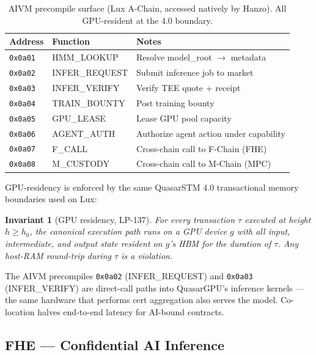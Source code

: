 \documentclass[11pt,letterpaper]{article}
\newtheorem{invariant}{Invariant}[section]
\begin{document}
\begin{table}[H]
\centering
\small
\begin{tabular}{lll}
\toprule
\textbf{Address} & \textbf{Function} & \textbf{Notes} \\
\midrule
\texttt{0x0a01} & \textsc{HMM\_LOOKUP} & Resolve model\_root $\to$ metadata \\
\texttt{0x0a02} & \textsc{INFER\_REQUEST} & Submit inference job to market \\
\texttt{0x0a03} & \textsc{INFER\_VERIFY} & Verify TEE quote + receipt \\
\texttt{0x0a04} & \textsc{TRAIN\_BOUNTY} & Post training bounty \\
\texttt{0x0a05} & \textsc{GPU\_LEASE} & Lease GPU pool capacity \\
\texttt{0x0a06} & \textsc{AGENT\_AUTH} & Authorize agent action under capability \\
\texttt{0x0a07} & \textsc{F\_CALL} & Cross-chain call to F-Chain (FHE) \\
\texttt{0x0a08} & \textsc{M\_CUSTODY} & Cross-chain call to M-Chain (MPC) \\
\bottomrule
\end{tabular}
\caption{AIVM precompile surface (Lux A-Chain, accessed natively by Hanzo). All GPU-resident at the 4.0 boundary.}
\end{table}

GPU-residency is enforced by the same QuasarSTM 4.0 transactional
memory boundaries used on Lux:

\begin{invariant}[GPU residency, LP-137]
For every transaction $\tau$ executed at height $h \ge h_0$, the
canonical execution path runs on a GPU device $g$ with all input,
intermediate, and output state resident on $g$'s HBM for the duration
of $\tau$. Any host-RAM round-trip during $\tau$ is a violation.
\end{invariant}

The AIVM precompiles \texttt{0x0a02} (\textsc{INFER\_REQUEST}) and
\texttt{0x0a03} (\textsc{INFER\_VERIFY}) are direct-call paths into
QuasarGPU's inference kernels --- the same hardware that performs cert
aggregation also serves the model. Co-location halves end-to-end
latency for AI-bound contracts.

\subsection{FHE --- Confidential AI Inference}
\end{document}
